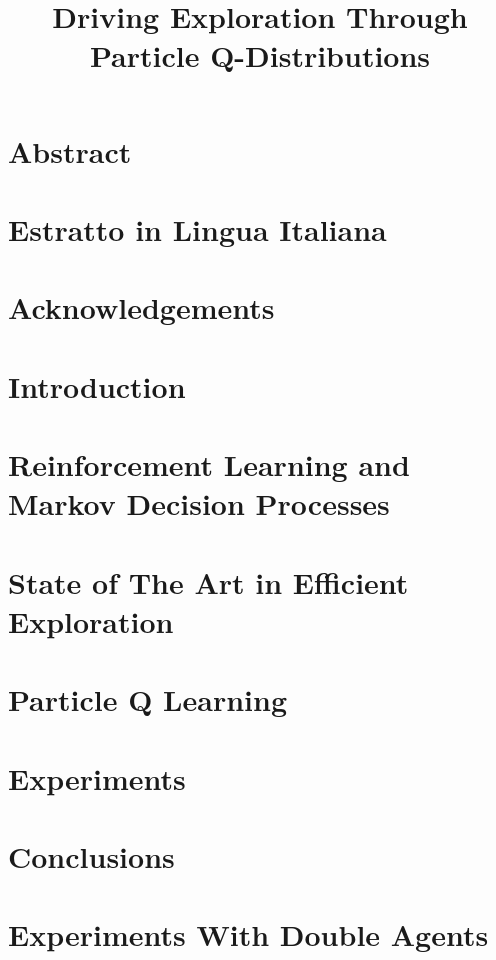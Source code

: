 \documentclass[11pt]{report}
\newcommand{\blankpage}{
\newpage
\thispagestyle{empty}
\mbox{}
\newpage
}
\begin{document}
\title{
	Driving Exploration Through Particle Q-Distributions
}

\blankpage
\chapter*{Abstract}

\blankpage
\chapter*{Estratto in Lingua Italiana}

\blankpage
\chapter*{Acknowledgements}

\blankpage
\tableofcontents

\listoffigures

\listofalgorithms


\chapter{Introduction}

\chapter{Reinforcement Learning and Markov Decision Processes} \label{chap:chapter2}
 
\chapter{State of The Art in Efficient Exploration} \label{chap:chapter3}
 
\chapter{Particle Q Learning} \label{chap:chapter4}
 
\chapter{Experiments}		\label{chap:chapter5}
 
\chapter{Conclusions}		\label{chap:chapter6}
 


\appendix
\chapter{Experiments With Double Agents}
\label{app:appendixA}
\end{document}
